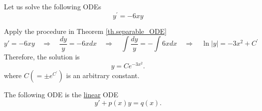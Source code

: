 \begin{example}[]
    Let us solve the following ODEs
    \begin{equation*}
        y^{\prime} = -6 x y
    \end{equation*}

    Apply the procedure in Theorem \ref{th.separable_ODE}
    \begin{equation*}
        y' = -6 x y
        \quad\Rightarrow\quad \frac{dy}{y} = -6 x dx
        \quad\Rightarrow\quad
        \int \frac{dy}{y} = - \int 6 x dx
        \quad\Rightarrow\quad
        \ln |y|=-3 x^2+C^{\prime}
    \end{equation*}
    Therefore, the solution is 
    \begin{equation*}
        y=C e^{-3 x^2}.
    \end{equation*}
    where $C(= \pm e^{C^{\prime}})$ is an arbitrary constant.
\end{example}

\begin{definition}
    The following ODE is the \underline{linear} ODE
    \begin{equation}\label{eq.linear}
        y' + p(x)y = q(x).
    \end{equation}
\end{definition}


